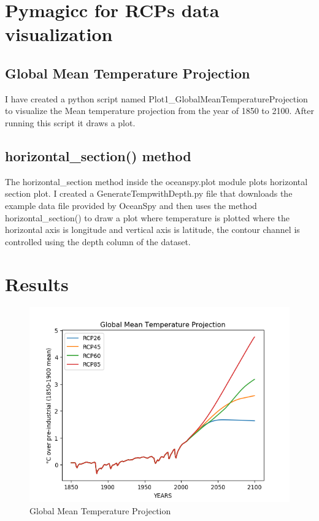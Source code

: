 \documentclass[12pt, letterpaper]{article}
\begin{document}
\section{Pymagicc for RCPs data visualization}

\subsection{Global Mean Temperature Projection}
I have created a python script named Plot1\_GlobalMeanTemperatureProjection  to visualize the Mean temperature projection from the year of 1850 to 2100. After running this script it draws a plot. 

\subsection{horizontal\_section() method}
The horizontal\_section method inside the oceanspy.plot module plots horizontal section plot. I created a GenerateTempwithDepth.py file that downloads the example data file provided by OceanSpy and then uses the method horizontal\_section() to draw a plot where temperature is plotted where the horizontal axis is longitude and vertical axis is latitude, the contour channel is controlled using the depth column of the dataset. 


\section{Results}
\begin{figure}
\includegraphics[width=1\textwidth]{Plot1_GlobalMeanTemperatureProjection.png}
\caption{Global Mean Temperature Projection}
\label{fig:Plot1_GlobalMeanTemperatureProjection}
\end{figure}
\end{document}
